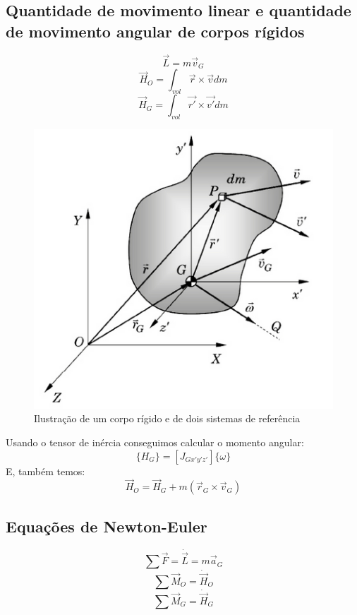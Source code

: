\documentclass[a4paper, 12pt]{article}
\begin{document}
	\subsection{Quantidade de movimento linear e quantidade de movimento angular de corpos rígidos}
	 	\begin{equation}
	 		\vec{L} = m\vec{v}_G
	 	\end{equation}
	 	\begin{equation}
	 		\vec{H}_O = \int_{vol} \vec{r} \times \vec{v}dm
	 	\end{equation}
	 	\begin{equation}
	 		\vec{H}_G = \int_{vol} \vec{r'} \times \vec{v'}dm
	 	\end{equation}
		\begin{figure}[h]
			\center
			\includegraphics[scale=0.5]{imagens/a6.png} 
			\caption{Ilustração de um corpo rígido e de dois sistemas de referência}
		\end{figure}	

		Usando o tensor de inércia conseguimos calcular o momento angular:
		\begin{equation}
			\{H_G\} = [J_{Gx'y'z'}]\{\omega \}
		\end{equation}
		E, também temos:
		\begin{equation}
			\vec{H}_O = \vec{H}_G + m (\vec{r}_G \times \vec{v}_G)
		\end{equation}
	
	\subsection{Equações de Newton-Euler}
		\begin{equation}
			\sum \vec{F} = \dot{\vec{L}} = m\vec{a}_G
			\label{1}
		\end{equation}
		\begin{equation}
			\sum \vec{M}_O = \dot{\vec{H}}_O
			\label{2}
		\end{equation}
		\begin{equation}
			\sum \vec{M}_G = \dot{\vec{H}}_G
			\label{3}
		\end{equation}
		
\end{document}
